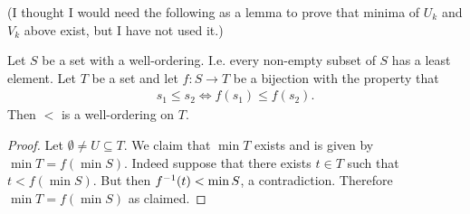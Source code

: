 \documentclass[12pt]{article}
\begin{document}
(I thought I would need the following as a lemma to prove that minima of $U_k$ and $V_k$ above
exist, but I have not used it.)
\begin{theorem*}
  Let $S$ be a set with a well-ordering. I.e. every non-empty subset of $S$ has a least
  element. Let $T$ be a set and let $f:S \to T$ be a bijection with the property that
  \begin{align*}
    s_1 \leq s_2 \iff f(s_1) \leq f(s_2).
  \end{align*}
  Then $<$ is a well-ordering on $T$.
\end{theorem*}
\begin{proof}
  Let $\emptyset \neq U \subseteq T$. We claim that $\min T$ exists and is given by
  $\min T = f(\min S)$. Indeed suppose that there exists $t \in T$ such that $t < f(\min S)$. But
  then $f^{-1}(t) < \min S$, a contradiction. Therefore $\min T = f(\min S)$ as claimed.
\end{proof}
\end{document}
